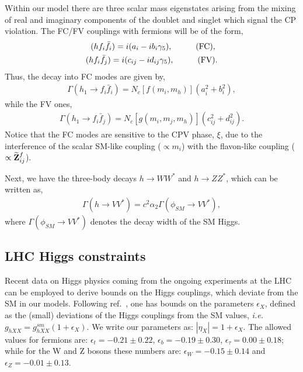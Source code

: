 \documentclass[aps,prd,groupaddress,floatfix,tighten,nofootinbib,showpacs,
amsfonts,superscriptaddress]{revtex4}
\begin{document}
Within our model there are three scalar mass eigenstates arising from the mixing of real and imaginary components of the doublet and singlet which signal the CP violation. 
The FC/FV couplings with fermions will be of the form,
\begin{eqnarray}
(h f_i \bar{f}_i) = i (a_i - i b_i \gamma_5), \hspace{1 cm} (\text{FC}),\; \\
(h f_i \bar{f}_j) = i (c_{ij} - i d_{ij} \gamma_5), \hspace{1 cm} (\text{FV}).
\end{eqnarray} 
Thus, the decay into FC modes are given by,
\begin{eqnarray}
\Gamma (h_1 \rightarrow f_i \bar{f}_i) = N_c [f(m_i,m_h)] (a_i^2 + b_i^2),
\end{eqnarray}
while the FV ones,
\begin{eqnarray}
	\Gamma (h_1 \rightarrow f_i \bar{f}_j) = N_c [g(m_i,m_j,m_h)] (c_{ij}^2 + d_{ij}^2).
\end{eqnarray}
Notice that the FC modes are sensitive to the CPV phase, $\xi$, due to the interference of the
scalar SM-like coupling ($\propto m_i$) with the flavon-like coupling ($\propto \widetilde{\bf Z}_{ij}^f$).

Next, we have the three-body decays $h \rightarrow WW^*$ and $h\rightarrow ZZ^*$, which
can be written as,
\begin{eqnarray}
	\Gamma (h \rightarrow VV^*) = c^2\alpha_2 \Gamma (\phi_{SM} \rightarrow VV^*),
\end{eqnarray}
where $\Gamma (\phi_{SM} \rightarrow VV^*)$ denotes the decay width of the SM Higgs. 


\subsection{LHC Higgs constraints}
Recent data on Higgs physics coming from the ongoing experiments at the LHC can be employed to derive bounds on the Higgs couplings,
which deviate from the SM in our models. Following ref.~\cite{Giardino:2013bma}, one
has bounds on the parameters $\epsilon_X$, defined as the (small) deviations of the 
Higgs couplings from the SM values, \textit{i.e.} $g_{hXX}= g^{sm}_{hXX} (1 + \epsilon_X)$.
We write our parameters as: $|\eta_X|= 1 + \epsilon_X$. 
The allowed values for fermions are:
$\epsilon_t= -0.21\pm 0.22$, $\epsilon_b= -0.19\pm 0.30$, $\epsilon_{\tau}= 0.00 \pm 0.18$;
while for the W and Z bosons these numbers are: $\epsilon_W= -0.15\pm 0.14$ and $\epsilon_Z= -0.01\pm 0.13$.
\end{document}
